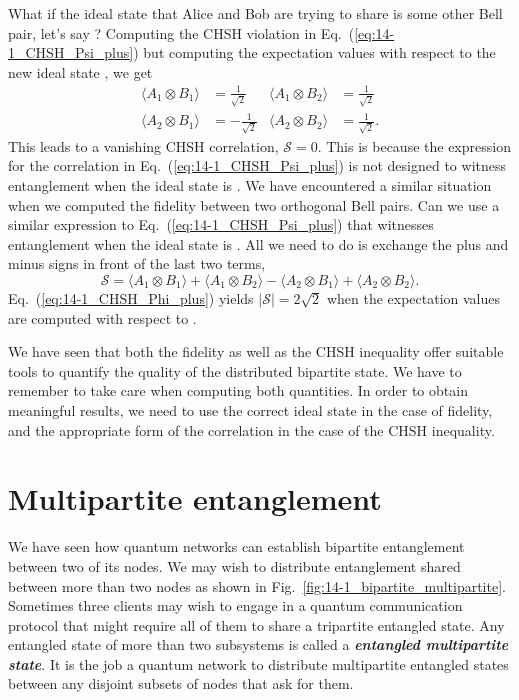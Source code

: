 What if the ideal state that Alice and Bob are trying to share is some other Bell pair, let's say \ket{\Phi^+}?
Computing the CHSH violation in Eq.~(\ref{eq:14-1_CHSH_Psi_plus}) but computing the expectation values with respect to the new ideal state \ket{\Phi^+}, we get
\begin{align}
    \langle A_1 \otimes B_1 \rangle & = \frac{1}{\sqrt{2}} & \langle A_1 \otimes B_2 \rangle & = \frac{1}{\sqrt{2}} \\
    \langle A_2 \otimes B_1 \rangle & = - \frac{1}{\sqrt{2}} & \langle A_2 \otimes B_2 \rangle & = \frac{1}{\sqrt{2}}.
\end{align}
This leads to a vanishing CHSH correlation, $\mathcal{S} = 0$.
This is because the expression for the correlation in Eq.~(\ref{eq:14-1_CHSH_Psi_plus}) is not designed to witness entanglement when the ideal state is \ket{\Phi^+}.
We have encountered a similar situation when we computed the fidelity between two orthogonal Bell pairs.
Can we use a similar expression to Eq.~(\ref{eq:14-1_CHSH_Psi_plus}) that witnesses entanglement when the ideal state is \ket{\Phi^+}.
All we need to do is exchange the plus and minus signs in front of the last two terms,
\begin{equation}
    \mathcal{S} = \langle A_1 \otimes B_1\rangle + \langle A_1 \otimes B_2\rangle - \langle A_2 \otimes B_1\rangle + \langle A_2 \otimes B_2\rangle.
    \label{eq:14-1_CHSH_Phi_plus}
\end{equation}
Eq.~(\ref{eq:14-1_CHSH_Phi_plus}) yields $|\mathcal{S}| = 2\sqrt{2}$ when the expectation values are computed with respect to \ket{\Phi^+}.

We have seen that both the fidelity as well as the CHSH inequality offer suitable tools to quantify the quality of the distributed bipartite state.
We have to remember to take care when computing both quantities.
In order to obtain meaningful results, we need to use the correct ideal state in the case of fidelity, and the appropriate form of the correlation in the case of the CHSH inequality.




\section{Multipartite entanglement}
\label{sec:14-2_multipartite}

We have seen how quantum networks can establish bipartite entanglement between two of its nodes.
We may wish to distribute entanglement shared between more than two nodes as shown in Fig.~\ref{fig:14-1_bipartite_multipartite}.
Sometimes three clients may wish to engage in a quantum communication protocol that might require all of them to share a tripartite entangled state.
Any entangled state of more than two subsystems is called a \textit{\textbf{entangled multipartite state}}.
It is the job a quantum network to distribute multipartite entangled states between any disjoint subsets of nodes that ask for them.

